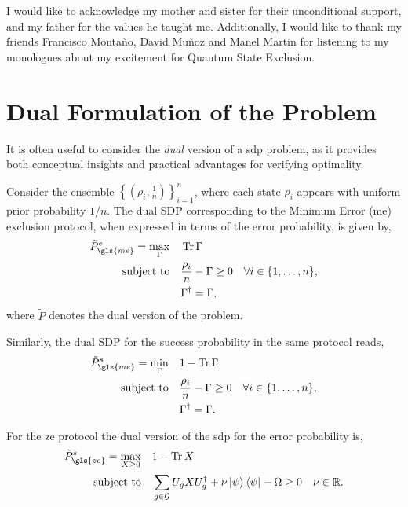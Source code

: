 \documentclass[12pt,letterpaper]{article}
\DeclareMathOperator{\tr}{Tr}
\begin{document}
I would like to acknowledge my mother and sister for their unconditional support, and my father for the values he taught me. Additionally, I would like to thank my friends Francisco Montaño, David Muñoz and Manel Martin for listening to my monologues about my excitement for Quantum State Exclusion.


\newpage
\appendix

\section{Dual Formulation of the Problem}\label{sectionDualFormulationOfTheProblem}

\hspace{20pt}It is often useful to consider the \emph{dual} version of a \gls{sdp} problem, as it provides both conceptual insights and practical advantages for verifying optimality. 

Consider the ensemble $\left\{ \left( \rho_i, \frac{1}{n} \right) \right\}_{i=1}^n$, where each state $\rho_i$ appears with uniform prior probability $1/n$. The dual SDP corresponding to the Minimum Error (\gls{me}) exclusion protocol, when expressed in terms of the error probability, is given by,
\begin{align*}
	\tilde{P}_{\gls{me}}^e = \max_{\Gamma} \quad & \tr{\Gamma} \\
	\text{subject to} \quad & \frac{\rho_i}{n} - \Gamma \geq 0 \quad \forall i \in \{1, \dots, n\}, \\
	& \Gamma^\dagger = \Gamma,
\end{align*}
where $\tilde{P}$ denotes the dual version of the problem.

Similarly, the dual SDP for the success probability in the same protocol reads,
\begin{align*}
	\tilde{P}_{\gls{me}}^s = \min_{\Gamma} \quad & 1 - \tr{\Gamma} \\
	\text{subject to} \quad & \frac{\rho_i}{n} - \Gamma \geq 0 \quad \forall i \in \{1, \dots, n\}, \\
	& \Gamma^\dagger = \Gamma.
\end{align*}

For the \gls{ze} protocol the dual version of the \gls{sdp} for the error probability is,
\begin{align*}
	\tilde{P}_{\gls{ze}}^s = \max_{X\geq 0} \quad & 1-\tr{X} \\
	\text{subject to} \quad & \sum_{g\in\mathcal{G}}U_gXU_g^\dagger+ \nu\ket{\psi}\bra{\psi}-\Omega \geq 0 \quad \nu \in \mathbb{R}.
\end{align*}
\end{document}
